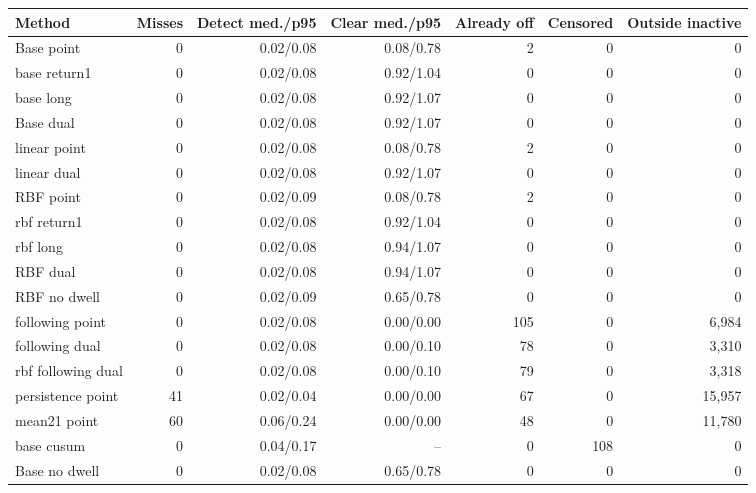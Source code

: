 \begin{tabular}{lrrrrrr}\toprule
Method & Misses & Detect med./p95 & Clear med./p95 & Already off & Censored & Outside inactive\\\midrule
Base point & 0 & 0.02/0.08 & 0.08/0.78 & 2 & 0 & 0 \\
base return1 & 0 & 0.02/0.08 & 0.92/1.04 & 0 & 0 & 0 \\
base long & 0 & 0.02/0.08 & 0.92/1.07 & 0 & 0 & 0 \\
Base dual & 0 & 0.02/0.08 & 0.92/1.07 & 0 & 0 & 0 \\
linear point & 0 & 0.02/0.08 & 0.08/0.78 & 2 & 0 & 0 \\
linear dual & 0 & 0.02/0.08 & 0.92/1.07 & 0 & 0 & 0 \\
RBF point & 0 & 0.02/0.09 & 0.08/0.78 & 2 & 0 & 0 \\
rbf return1 & 0 & 0.02/0.08 & 0.92/1.04 & 0 & 0 & 0 \\
rbf long & 0 & 0.02/0.08 & 0.94/1.07 & 0 & 0 & 0 \\
RBF dual & 0 & 0.02/0.08 & 0.94/1.07 & 0 & 0 & 0 \\
RBF no dwell & 0 & 0.02/0.09 & 0.65/0.78 & 0 & 0 & 0 \\
following point & 0 & 0.02/0.08 & 0.00/0.00 & 105 & 0 & 6,984 \\
following dual & 0 & 0.02/0.08 & 0.00/0.10 & 78 & 0 & 3,310 \\
rbf following dual & 0 & 0.02/0.08 & 0.00/0.10 & 79 & 0 & 3,318 \\
persistence point & 41 & 0.02/0.04 & 0.00/0.00 & 67 & 0 & 15,957 \\
mean21 point & 60 & 0.06/0.24 & 0.00/0.00 & 48 & 0 & 11,780 \\
base cusum & 0 & 0.04/0.17 & -- & 0 & 108 & 0 \\
Base no dwell & 0 & 0.02/0.08 & 0.65/0.78 & 0 & 0 & 0 \\
\bottomrule\end{tabular}
